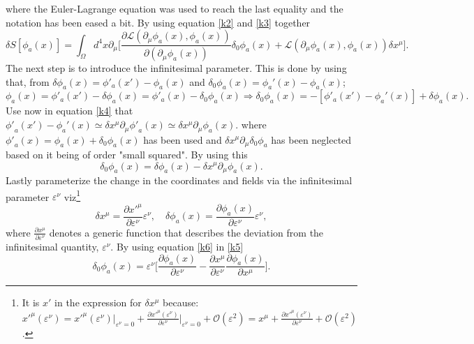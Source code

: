 where the Euler-Lagrange equation was used to reach the last equality and the notation has been eased a bit. By using equation \eqref{k2} and \eqref{k3} together
\begin{equation}
	\delta S[\phi_a(x)]=\int_{\Omega}d^4x \partial_\mu\bigg[\frac{\partial \mathcal{L}(\partial_\mu\phi_a(x),\phi_a(x))}{\partial (\partial_\mu \phi_a(x))}\delta_0\phi_a(x)+\mathcal{L}(\partial_\mu\phi_a(x),\phi_a(x))\delta x^\mu\bigg].
	\label{k7}
\end{equation} 
The next step is to introduce the infinitesimal parameter. This is done by using that, from $\delta\phi_a(x)=\phi'_a(x')-\phi_a(x)$ and $\delta_0\phi_a(x)=\phi_a'(x)-\phi_a(x)$;
\begin{equation}
	\phi_a(x)=\phi'_a(x')-\delta\phi_a(x)=\phi'_a(x)-\delta_0\phi_a(x)\Rightarrow\delta_0\phi_a(x)=-[\phi'_a(x')-\phi_a'(x)]+\delta\phi_a(x).
	\label{k4}
\end{equation}  
Use now in equation \eqref{k4} that ${\phi'}_a(x')-\phi_a'(x)\simeq \delta x^\mu\partial_\mu{\phi'}_a(x)\simeq \delta x^\mu\partial_\mu\phi_a(x)$. where ${\phi'}_a(x)=\phi_a(x)+\delta_0\phi_a(x)$ has been used and $\delta x^\mu\partial_\mu\delta_0\phi_a$ has been neglected based on it being of order "small squared". By using this
\begin{equation}
	\delta_0\phi_a(x)=\delta\phi_a(x)-\delta x^\mu\partial_\mu\phi_a(x).
	\label{k5}
\end{equation}  
Lastly parameterize the change in the coordinates and fields via the infinitesimal parameter $\varepsilon^\nu$ viz\footnote{It is $x'$ in the expression for $\delta x^\mu$ because: ${x'}^\mu(\varepsilon^\nu)={x'}^\mu(\varepsilon^\nu)|_{\varepsilon^\nu=0}+\frac{\partial {x'}^\mu(\varepsilon^\nu)}{\partial \varepsilon^\nu}\big|_{\varepsilon^\nu=0}+\mathcal{O}(\varepsilon^2)={x}^\mu+\frac{\partial {x'}^\mu(\varepsilon^\nu)}{\partial \varepsilon^\nu}+\mathcal{O}(\varepsilon^2)$.}
\begin{equation}
	\delta x^\mu =\frac{\partial {x'}^\mu}{\partial \varepsilon^\nu}\varepsilon^\nu, \quad \delta \phi_a(x)=\frac{\partial \phi_a(x)}{\partial \varepsilon^\nu}\varepsilon^\nu,
	\label{k6}
\end{equation} 
where $\frac{\partial x^\mu}{\partial \varepsilon^\nu}$ denotes a generic function that describes the deviation from the infinitesimal quantity, $\varepsilon^\nu$. By using equation \eqref{k6} in \eqref{k5}
\begin{equation}
	\delta_0\phi_a(x)=\varepsilon^\nu\bigg[\frac{\partial \phi_a(x)}{\partial \varepsilon^\nu}-\frac{\partial x^\mu}{\partial \varepsilon^\nu} \frac{\partial \phi_a(x)}{\partial x^\mu}\bigg].
	\label{k8}
\end{equation} 
